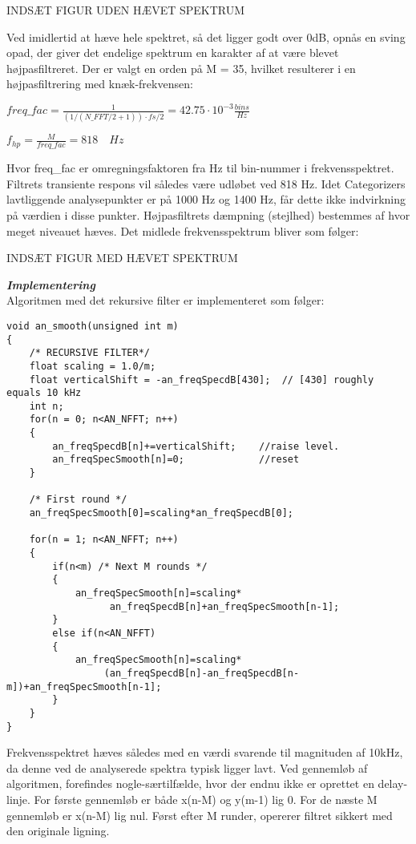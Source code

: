 INDSÆT FIGUR UDEN HÆVET SPEKTRUM

Ved imidlertid at hæve hele spektret, så det ligger godt over 0dB, opnås en sving opad, der giver det endelige spektrum en karakter af at være blevet højpasfiltreret. Der er valgt en orden på M = 35, hvilket resulterer i en højpasfiltrering med knæk-frekvensen:
\begin{center}
$ freq\_ fac=\frac { 1 }{ \left( { 1 }/{ { \left( N\_ FFT/2+1 \right)  } } \right) \cdot { fs }/{ 2 } } =42.75\cdot { 10 }^{ -3 }\frac { bins }{ Hz } $
\end{center}
\begin{center}
${ f }_{ hp }=\frac { M }{ freq\_ fac } =818\quad Hz $
\end{center} 

Hvor freq\_fac er omregningsfaktoren fra Hz til bin-nummer i frekvensspektret. Filtrets transiente respons vil således være udløbet ved 818 Hz. Idet Categorizers lavtliggende analysepunkter er på 1000 Hz og 1400 Hz, får dette ikke indvirkning på værdien i disse punkter. Højpasfiltrets dæmpning (stejlhed) bestemmes af hvor meget niveauet hæves. Det midlede frekvensspektrum bliver som følger:

INDSÆT FIGUR MED HÆVET SPEKTRUM

\textbf{\textit{Implementering}} \\
Algoritmen med det rekursive filter er implementeret som følger:
\begin{verbatim}void an_smooth(unsigned int m)
{
    /* RECURSIVE FILTER*/
    float scaling = 1.0/m;
    float verticalShift = -an_freqSpecdB[430];	// [430] roughly equals 10 kHz
    int n;
    for(n = 0; n<AN_NFFT; n++)
    {
        an_freqSpecdB[n]+=verticalShift;    //raise level.
        an_freqSpecSmooth[n]=0;             //reset
    }

    /* First round */
    an_freqSpecSmooth[0]=scaling*an_freqSpecdB[0];

    for(n = 1; n<AN_NFFT; n++)
    {
        if(n<m)	/* Next M rounds */
        {
            an_freqSpecSmooth[n]=scaling*
                  an_freqSpecdB[n]+an_freqSpecSmooth[n-1];
        }
        else if(n<AN_NFFT)
        {
            an_freqSpecSmooth[n]=scaling*
                 (an_freqSpecdB[n]-an_freqSpecdB[n-m])+an_freqSpecSmooth[n-1];
        }
    }
}\end{verbatim}
Frekvensspektret hæves således med en værdi svarende til magnituden af 10kHz, da denne ved de analyserede spektra typisk ligger lavt. Ved gennemløb af algoritmen, forefindes nogle-særtilfælde, hvor der endnu ikke er oprettet en delay-linje. For første gennemløb er både x(n-M) og y(m-1) lig 0. For de næste M gennemløb er x(n-M) lig nul. Først efter M runder, opererer filtret sikkert med den originale ligning.